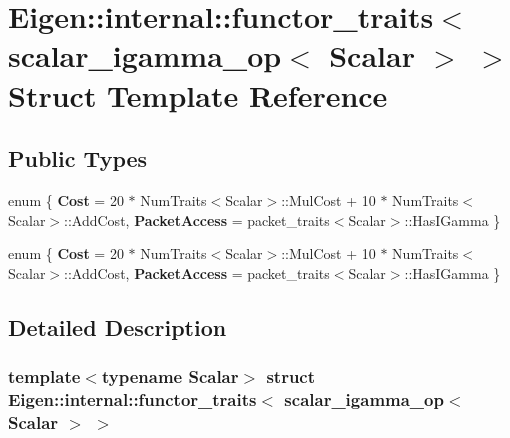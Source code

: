 \hypertarget{struct_eigen_1_1internal_1_1functor__traits_3_01scalar__igamma__op_3_01_scalar_01_4_01_4}{}\section{Eigen\+:\+:internal\+:\+:functor\+\_\+traits$<$ scalar\+\_\+igamma\+\_\+op$<$ Scalar $>$ $>$ Struct Template Reference}
\label{struct_eigen_1_1internal_1_1functor__traits_3_01scalar__igamma__op_3_01_scalar_01_4_01_4}
\subsection*{Public Types}
\begin{DoxyCompactItemize}
\item 
\mbox{\label{struct_eigen_1_1internal_1_1functor__traits_3_01scalar__igamma__op_3_01_scalar_01_4_01_4_abcc44dd0b0a09c1032d862dda749c939}} 
enum \{ {\bfseries Cost} = 20 $\ast$ Num\+Traits$<$Scalar$>$\+:\+:Mul\+Cost + 10 $\ast$ Num\+Traits$<$Scalar$>$\+:\+:Add\+Cost, 
{\bfseries Packet\+Access} = packet\+\_\+traits$<$Scalar$>$\+:\+:Has\+I\+Gamma
 \}
\item 
\mbox{\label{struct_eigen_1_1internal_1_1functor__traits_3_01scalar__igamma__op_3_01_scalar_01_4_01_4_a624579f2c224f527ffc735e13615ec14}} 
enum \{ {\bfseries Cost} = 20 $\ast$ Num\+Traits$<$Scalar$>$\+:\+:Mul\+Cost + 10 $\ast$ Num\+Traits$<$Scalar$>$\+:\+:Add\+Cost, 
{\bfseries Packet\+Access} = packet\+\_\+traits$<$Scalar$>$\+:\+:Has\+I\+Gamma
 \}
\end{DoxyCompactItemize}


\subsection{Detailed Description}
\subsubsection*{template$<$typename Scalar$>$\newline
struct Eigen\+::internal\+::functor\+\_\+traits$<$ scalar\+\_\+igamma\+\_\+op$<$ Scalar $>$ $>$}



